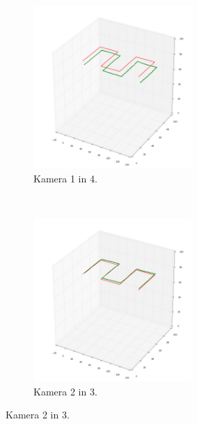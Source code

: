 \documentclass[a4paper, 12pt]{book}
\begin{document}
\begin{figure}
    \begin{subfigure}[t]{0.5\textwidth}
        \centering
        \includegraphics[width=6cm]{14.png}
        \caption{Kamera 1 in 4.}
    \end{subfigure}~
    \begin{subfigure}[t]{0.5\textwidth}
        \centering
        \includegraphics[width=6cm]{23.png}
        \caption{Kamera 2 in 3.}
    \end{subfigure}
    

\end{figure}
\end{document}

